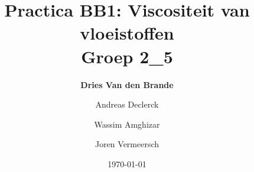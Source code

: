 \documentclass[12pt]{article}
\begin{document}
    
\title{\textbf{Practica BB1: Viscositeit van vloeistoffen} \\\small{Groep 2\_5}}
\author{\textbf{Dries Van den Brande} \and Andreas Declerck \and Wassim Amghizar \and Joren Vermeersch}
\date{\today}

\maketitle



%

















%
\end{document}
